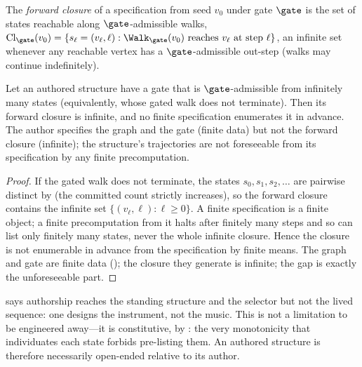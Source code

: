 \begin{definition}
\label{def:forward-closure}
The \emph{forward closure} of a specification from seed $v_0$ under gate $\gate$
is the set of states reachable along $\gate$-admissible walks,
$\mathrm{Cl}_\gate(v_0)=\{s_\ell=(v_\ell,\ell): \Walk_\gate(v_0)\text{ reaches }
v_\ell\text{ at step }\ell\}$, an infinite set whenever any reachable vertex has a
$\gate$-admissible out-step \textup{(}walks may continue indefinitely\textup{)}.
\end{definition}

\begin{theorem}
\label{thm:open}
Let an authored structure have a gate that is $\gate$-admissible from infinitely
many states \textup{(}equivalently, whose gated walk does not terminate\textup{)}.
Then its forward closure is infinite, and no finite specification enumerates it
in advance. The author specifies the graph and the gate \textup{(}finite
data\textup{)} but not the forward closure \textup{(}infinite\textup{)}; the
structure's trajectories are not foreseeable from its specification by any finite
precomputation.
\end{theorem}

\begin{proof}
If the gated walk does not terminate, the states $s_0,s_1,s_2,\dots$ are pairwise
distinct by  (the committed count strictly increases), so the
forward closure contains the infinite set $\{(v_\ell,\ell):\ell\ge0\}$. A finite
specification is a finite object; a finite precomputation from it halts after
finitely many steps and so can list only finitely many states, never the whole
infinite closure. Hence the closure is not enumerable in advance from the
specification by finite means. The graph and gate are finite data
(); the closure they generate is infinite; the gap is exactly the
unforeseeable part.
\end{proof}

\begin{remark}
\label{rem:instrument}
 says authorship reaches the standing structure and the selector
but not the lived sequence: one designs the instrument, not the music. This is
not a limitation to be engineered away---it is constitutive, by
: the very monotonicity that individuates each state forbids
pre-listing them. An authored structure is therefore necessarily open-ended
relative to its author.
\end{remark}

